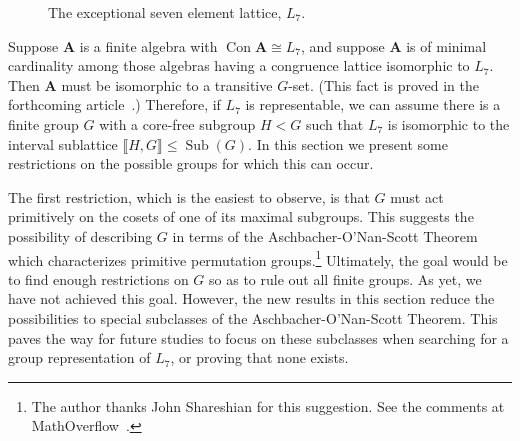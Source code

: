 \documentclass{gen-j-l}
\newcommand{\lb}{\ensuremath{\llbracket}}
\newcommand{\rb}{\ensuremath{\rrbracket}}
\newcommand{\<}{\ensuremath{\langle}}
\renewcommand{\>}{\ensuremath{\rangle}}
\theoremstyle{plain}
\theoremstyle{definition}
\theoremstyle{remark}
\numberwithin{theorem}{section}
\numberwithin{claim}{section}
\numberwithin{equation}{section}
\numberwithin{conjecture}{section}
\renewcommand{\leq}{\ensuremath{\leqslant}}
\newcommand{\Con}{\ensuremath{\operatorname{Con}}}
\newcommand{\Sub}{\ensuremath{\operatorname{Sub}}}
\newcommand{\2}{\ensuremath{\mathbf{2}}}
\newcommand{\3}{\ensuremath{\mathbf{3}}}
\newcommand{\bA}{\ensuremath{\mathbf{A}}}
\newcommand{\Gset}{$G$-set}
\begin{document}
\begin{figure}[h!]
\begin{center}
  {
  }
\end{center}
  \caption{The exceptional seven element lattice, $L_7$.}
  \label{fig:L7}
\end{figure}

Suppose $\bA$ is a finite algebra with $\Con \bA \cong L_7$, and
suppose $\bA$ is of minimal cardinality among those algebras having
a congruence lattice isomorphic to $L_7$.  Then 
$\bA$ must be isomorphic to a transitive \Gset.
(This fact is proved in the forthcoming article~\cite{gsets}.)  
Therefore, if $L_7$ is representable, we can assume there is a finite group $G$ with a 
core-free
subgroup $H<G$ such that $L_7$ is isomorphic to the interval
sublattice $\lb H,G \rb \leq \Sub(G)$.  In this section we present some restrictions
on the possible groups for which this can occur.  

The first restriction, which is
the easiest to observe, is that $G$ must act primitively on the cosets of one of its
maximal subgroups.  This suggests the possibility of describing $G$ in terms of
the Aschbacher-O'Nan-Scott Theorem which characterizes primitive
permutation groups.\footnote{The author thanks John Shareshian for 
this suggestion. See the comments at MathOverflow~\cite{MO85724}.}
Ultimately, the goal would be to find enough
restrictions on $G$ so as to rule out all finite groups.  As yet, we have not
achieved this goal.  However, the new results in this section reduce the
possibilities to special subclasses of the Aschbacher-O'Nan-Scott
Theorem.  This paves the way for future studies to focus on these subclasses
when searching for a group representation of $L_7$, or proving that none exists.
\end{document}
